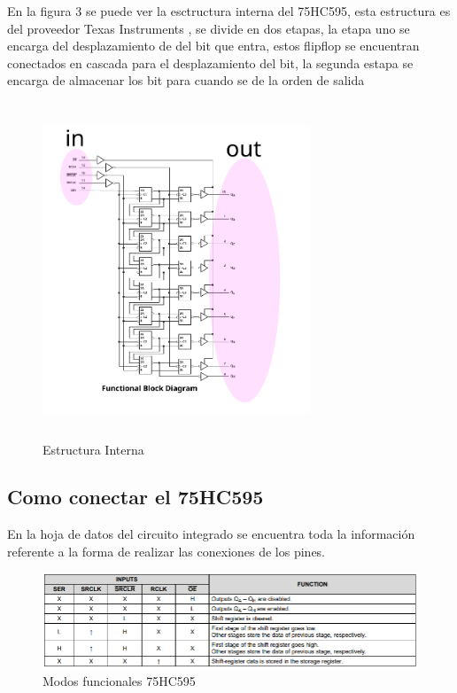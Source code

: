 \documentclass{article}
\begin{document}
En la figura 3 se puede ver la esctructura interna del 75HC595, esta estructura es del proveedor Texas Instruments \cite{Datasheet}, se divide en dos etapas, la etapa uno se encarga del desplazamiento de del bit que entra, estos flipflop se encuentran conectados en cascada para el desplazamiento del bit, la segunda estapa se encarga de almacenar los bit para cuando se de la orden de salida


\begin{figure}[H]
    \includegraphics[width=8cm,angle=0, height=10cm ]{imagen/estructuraInterna.pdf}
    \centering
    \caption{Estructura Interna}
    \label{fig:Estructura Interna}
    \end{figure}

\subsection{Como conectar el 75HC595}
En la hoja de datos del circuito integrado se encuentra toda la información referente a la forma de realizar las conexiones de los pines.
    \begin{figure}[h]
    \includegraphics[width=12cm]{imagen/Conexiones.png}
    \centering
    \caption{Modos funcionales 75HC595}
    \label{fig:diagrama}
    \end{figure}
    
\end{document}
